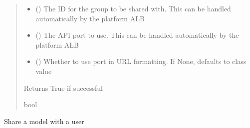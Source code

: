 \documentclass[letterpaper,10pt,english]{sphinxmanual}
\begin{document}
\begin{fulllineitems}
\begin{fulllineitems}
\begin{quote}
\begin{description}
\begin{itemize}
\item {} 
\sphinxAtStartPar
{} () \textendash{} The ID for the group to be shared with. This can be handled automatically by the platform ALB

\item {} 
\sphinxAtStartPar
{} (\sphinxstyleliteralemphasis{\sphinxupquote{ (}}\sphinxstyleliteralemphasis{\sphinxupquote{)}}) \textendash{} The API port to use. This can be handled automatically by the platform ALB

\item {} 
\sphinxAtStartPar
{} (\sphinxstyleliteralemphasis{\sphinxupquote{ (}}\sphinxstyleliteralemphasis{\sphinxupquote{)}}) \textendash{} Whether to use port in URL formatting. If None, defaults to class value

\end{itemize}

\sphinxAtStartPar
{} \textendash{} Returns True if successful

\sphinxAtStartPar
bool

\end{description}\end{quote}

\end{fulllineitems}


\begin{fulllineitems}
\label{\detokenize{aisquared.platform:aisquared.platform.AISquaredPlatformClient.AISquaredPlatformClient.share_model_with_user}}
\pysigstartsignatures
{}
\pysigstopsignatures
\sphinxAtStartPar
Share a model with a user


\end{fulllineitems}
\end{fulllineitems}
\end{document}
